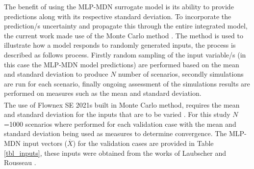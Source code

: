 \documentclass[a4paper,fleqn]{cas-sc}
\begin{document}
The benefit of using the MLP-MDN surrogate model is its ability to provide predictions along with  its respective standard deviation. To incorporate the prediction/s uncertainty and propagate this through the entire integrated model, the current work made use of the Monte Carlo method \cite{Thomopoulos2013}. The method is used to illustrate how a model responds to randomly generated inputs, the process is described as follows process. Firstly random sampling of the input variable/s (in this case the MLP-MDN model predictions) are performed based on the mean and standard deviation to produce $N$ number of scenarios, secondly simulations are run for each scenario, finally ongoing assessment of the simulations results are performed on measures such as the mean and standard deviation.\\ 

The use of Flownex SE\textsuperscript{\textregistered} 2021s built in Monte Carlo method, requires the mean and standard deviation for the inputs that are to be varied \cite{flownex}. For this study $N$=1000 scenarios where performed for each validation case with the mean and standard deviation being used as measures to determine convergence. The MLP-MDN input vectors ($\overline{X}$) for the validation cases are provided in Table \ref{tbl_inputs}, these inputs were obtained from the works of Laubscher and Rousseau \cite{Laubscher2019b}.\\
\end{document}
